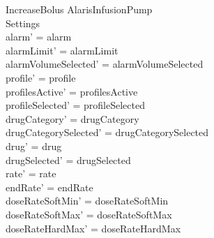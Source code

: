 \begin{schema}{IncreaseBolus}
	\Delta AlarisInfusionPump\\
	
	Settings\\
	\where
	alarm' = alarm\\
	alarmLimit' = alarmLimit\\
	alarmVolumeSelected' = alarmVolumeSelected\\
	profile' = profile\\
	profilesActive' = profilesActive\\  
	  profileSelected' = profileSelected\\
	drugCategory' = drugCategory\\ drugCategorySelected' = drugCategorySelected\\
	drug' = drug\\ drugSelected' = drugSelected\\
	rate' = rate\\
	endRate' = endRate\\
	doseRateSoftMin' = doseRateSoftMin\\
		
	doseRateSoftMax' = doseRateSoftMax\\
	doseRateHardMax' = doseRateHardMax\\
	

\end{schema}
